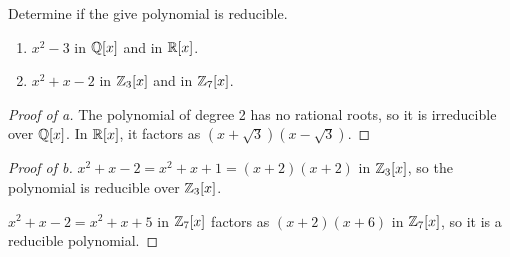 \documentclass[../hw5]{subfiles}
\begin{document}
\begin{problem}
Determine if the give polynomial is reducible.
\begin{enumerate}[label=\alph*)]
	\item $x^2 - 3$ in $\mathbb{Q}[x]$ and in $\mathbb{R}[x]$.
	\item $x^2 + x-2$ in $\mathbb{Z}_3[x]$ and in $\mathbb{Z}_7[x]$.
\end{enumerate}
\end{problem}
\begin{proof}[Proof of a]
	The polynomial of degree 2 has no rational roots, so it is irreducible over $\mathbb{Q}[x]$.
	In $\mathbb{R}[x]$, it factors as $(x + \sqrt{3} )(x - \sqrt{3} )$.
\end{proof}
\begin{proof}[Proof of b]
	$x^2  + x - 2 = x^2 + x + 1 = (x+2)(x+2)$ in $\mathbb{Z}_3[x]$, so the polynomial is reducible over $\mathbb{Z}_3[x]$.

	$x^2 + x-2=x^2+x+5$ in $\mathbb{Z}_7[x]$ factors as $(x+2)(x+6)$ in  $\mathbb{Z}_7[x]$, so it is a reducible polynomial.
\end{proof}
\end{document}
